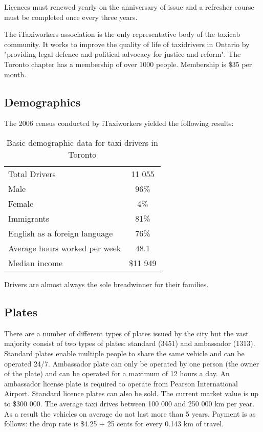 \documentclass[11pt]{article}
\begin{document}
Licences must renewed yearly on the anniversary of issue and a refresher course must 
be completed once every three years\cite{MLSChp545}.

The iTaxiworkers association is the only representative body of the taxicab community. It
works to improve the quality of life of taxidrivers in Ontario by "providing legal defence
and political advocacy for justice and reform"\cite{iTaxiWorkers2012}. The Toronto chapter
has a membership of over 1000 people. Membership is \$35 per month\cite{iTaxi2012, Abdiemail}.

\subsection{Demographics}
The 2006 census conducted by iTaxiworkers yielded the following results\cite{iTaxiWorkers2012}:
\begin{table}[h]
\centering
\caption{Basic demographic data for taxi drivers in Toronto}
\begin{tabular}{l c}
 Total Drivers & 11 055 \\
 Male & 96\% \\
 Female & 4\% \\
 Immigrants & 81\% \\
 English as a foreign language & 76\% \\
 Average hours worked per week & 48.1 \\
 Median income & \$11 949 \\
\end{tabular}
\end{table}

Drivers are almost always the sole breadwinner for their families\cite{Abdiphone}.

\subsection{Plates}
There are a number of different types of plates issued by the city but the vast majority 
consist of two types of plates: standard (3451) and ambassador (1313)\cite{thestar2012}. 
Standard plates enable multiple people to share the same vehicle and can be operated 24/7. 
Ambassador plate can only be operated by one person (the owner of the plate) and can be 
operated for a maximum of 12 hours a day. An ambassador license plate is required to 
operate from Pearson International Airport. Standard licence plates can also be sold. 
The current market value is up to \$300 000\cite{thestar2012}. The average taxi drives between 100 000 and 
250 000 km per year\cite{thestar2012}. As a result the vehicles on average do not last more than 5 
years\cite{thestar2012}. Payment is as follows: the drop rate is \$4.25 + 25 cents for every 0.143 km of 
travel\cite{thestar2012}.
\end{document}
